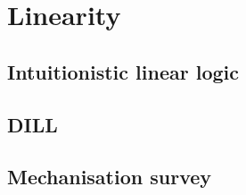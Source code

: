 \chapter{Linearity}\label{sec:linearity}

\section{Intuitionistic linear logic}\label{sec:ill}


\section{DILL}


\section{Mechanisation survey}

